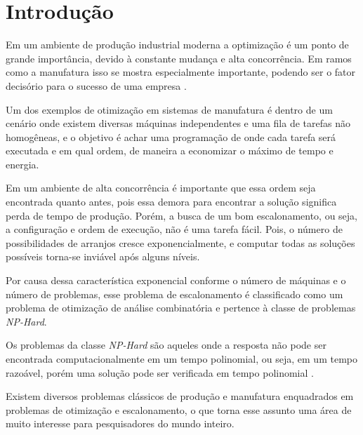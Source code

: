 
\chapter{Introdução}
    Em um ambiente de produção industrial moderna a optimização é um ponto de grande importância, devido à constante mudança e alta concorrência. Em ramos como a manufatura isso se mostra especialmente importante, podendo ser o fator decisório para o sucesso de uma empresa \cite{Wari2016}.\newline

    Um dos exemplos de otimização em sistemas de manufatura é dentro de um cenário onde existem diversas máquinas independentes e uma fila de tarefas não homogêneas, e o objetivo é achar uma programação de onde cada tarefa será executada e em qual ordem, de maneira a economizar o máximo de tempo e energia.\newline

    Em um ambiente de alta concorrência é importante que essa ordem seja encontrada quanto antes, pois essa demora para encontrar a solução significa perda de tempo de produção. Porém, a busca de um bom escalonamento, ou seja, a configuração e ordem de execução, não é uma tarefa fácil. Pois, o número de possibilidades de arranjos cresce exponencialmente, e computar todas as soluções possíveis torna-se inviável após alguns níveis. \newline

    Por causa dessa característica exponencial conforme o número de máquinas e o número de problemas, esse problema de escalonamento é classificado como um problema de otimização de análise combinatória e pertence à classe de problemas \textit{NP-Hard}. \newline

    Os problemas da classe \textit{NP-Hard} são aqueles onde a resposta não pode ser encontrada computacionalmente em um tempo polinomial, ou seja, em um tempo razoável, porém uma solução pode ser verificada em tempo polinomial \cite{Eswaramurthy2008}.\newline

    Existem diversos problemas clássicos de produção e manufatura enquadrados em problemas de otimização e escalonamento, o que torna esse assunto uma área de muito interesse para pesquisadores do mundo inteiro.\newline

